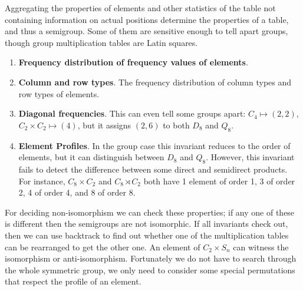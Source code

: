 \documentclass{amsart}
\theoremstyle{plain}
\theoremstyle{definition}
\begin{document}
Aggregating the properties of elements and other statistics of the table not containing information on actual positions determine the properties of a table, and thus a semigroup. Some of them are sensitive enough to tell apart groups, though group multiplication tables are Latin squares.
\begin{enumerate}
\item\textbf{Frequency distribution of frequency values of elements}. %
\item\textbf{Column and row types}. The frequency distribution of column types and row types of elements. %
\item \textbf{Diagonal frequencies}. This can even tell some groups apart: $C_4\mapsto (2,2)$, $C_2\times C_2\mapsto (4)$, but it assigns $(2,6)$ to both $D_8$ and $Q_8$.
\item \textbf{Element Profiles}. In the group case this invariant reduces to the order of elements, but it can distinguish between $D_8$ and $Q_8$. However, this invariant fails to detect the difference between some direct and semidirect products. For instance, $C_8\times C_2$ and $C_8\rtimes C_2$ both have 1 element of order 1, 3 of order 2, 4 of order 4, and 8 of order 8.
\end{enumerate} 

For deciding non-isomorphism we can check these properties; if any one of these is different then the semigroups are not isomorphic.
If all invariants check out, then we can use backtrack to find out whether one of the multiplication tables can be rearranged to get the other one.
An element of $C_2\times S_n$ can witness the isomorphism or anti-isomorphism.
Fortunately we do not have to search through the whole symmetric group, we only need to consider some special permutations that respect the profile of an element.
\end{document}
